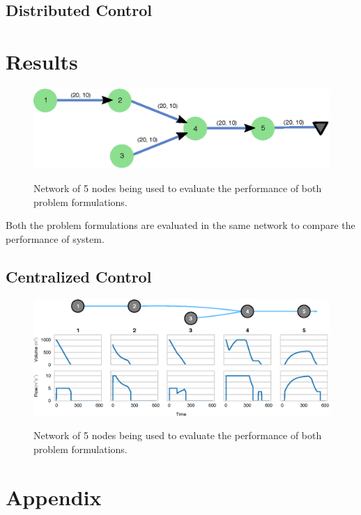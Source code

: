 \documentclass{article}
\begin{document}
\subsection{Distributed Control}

\section{Results}
\begin{figure}[H]
	\includegraphics[width=\textwidth]{network.eps}
	\label{fig1}
	\caption{Network of 5 nodes being used to evaluate the performance of both problem formulations.}
\end{figure}

Both the problem formulations are evaluated in the same network to compare the performance of system. 

\subsection{Centralized Control}
\begin{figure}[H]
	\includegraphics[width=\textwidth]{ctrl_central.eps}
	\label{fig1}
	\caption{Network of 5 nodes being used to evaluate the performance of both problem formulations.}
\end{figure}

\section{Appendix}
  
\end{document}
